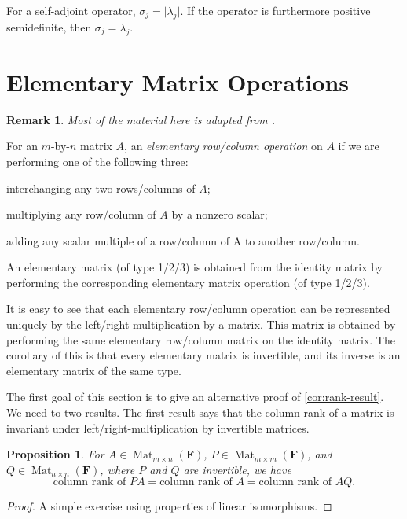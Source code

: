 \documentclass[10pt]{article}
\numberwithin{equation}{section}
\theoremstyle{plain-star}
\newtheorem{prop}[equation]{Proposition}
\theoremstyle{definition-star}
\theoremstyle{remark-star}
\newtheorem*{rem*}{Remark}
\theoremstyle{plain-star}
\newcommand{\F}{\mathbf{F}}
\newcommand{\Mat}{\operatorname{Mat}}
\newcommand{\abs}[1]{\lvert #1 \rvert}
\newcommand{\df}[1]{\textit{#1}}
\begin{document}
For a self-adjoint operator, $\sigma_j = \abs{\lambda_j}$. If the operator is furthermore positive semidefinite, then $\sigma_j = \lambda_j$.

\newpage
\appendix
\section{Elementary Matrix Operations}\label{sec:elem-mat-op}
\begin{rem*}
    Most of the material here is adapted from \cite[Chapter 3]{friedberg2003linear}.
\end{rem*}

For an $m$-by-$n$ matrix $A$, an \df{elementary row/column operation} on $A$ if we are performing one of the following three: 
\begin{description}[font=\sffamily]
    \item[Type 1] interchanging any two rows/columns of $A$; 
    \item[Type 2] multiplying any row/column of $A$ by a nonzero scalar; 
    \item[Type 3] adding any scalar multiple of a row/column of A to another row/column.
\end{description}

An elementary matrix (of type 1/2/3) is obtained from the identity matrix by performing the corresponding elementary matrix operation (of type 1/2/3).

It is easy to see that each elementary row/column operation can be represented uniquely by the left/right-multiplication by a matrix. This matrix is obtained by performing the same elementary row/column matrix on the identity matrix. The corollary of this is that every elementary matrix is invertible, and its inverse is an elementary matrix of the same type.

The first goal of this section is to give an alternative proof of \cref{cor:rank-result}. We need to two results. The first result says that the column rank of a matrix is invariant under left/right-multiplication by invertible matrices.
\begin{prop}\label{prop:rank-same}
    For $A \in \Mat_{m\times n}(\F)$, $P \in \Mat_{m \times m}(\F)$, and $Q \in \Mat_{n \times n}(\F)$, where $P$ and $Q$ are invertible, we have \[
        \text{column rank of } PA = \text{column rank of } A = \text{column rank of } AQ.
    \]
\end{prop}
\begin{proof}
    A simple exercise using properties of linear isomorphisms.
\end{proof}
\end{document}
